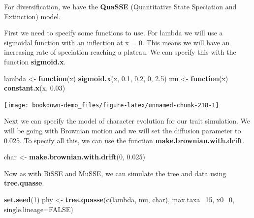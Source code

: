 \documentclass[
]{book}
\newenvironment{Shaded}{\begin{snugshade}}{\end{snugshade}}
\newcommand{\ControlFlowTok}[1]{\textcolor[rgb]{0.13,0.29,0.53}{\textbf{#1}}}
\newcommand{\DataTypeTok}[1]{\textcolor[rgb]{0.13,0.29,0.53}{#1}}
\newcommand{\DecValTok}[1]{\textcolor[rgb]{0.00,0.00,0.81}{#1}}
\newcommand{\FloatTok}[1]{\textcolor[rgb]{0.00,0.00,0.81}{#1}}
\newcommand{\KeywordTok}[1]{\textcolor[rgb]{0.13,0.29,0.53}{\textbf{#1}}}
\newcommand{\NormalTok}[1]{#1}
\newcommand{\OtherTok}[1]{\textcolor[rgb]{0.56,0.35,0.01}{#1}}
\newcommand{\StringTok}[1]{\textcolor[rgb]{0.31,0.60,0.02}{#1}}
\begin{document}
For diversification, we have the \textbf{QuaSSE} (Quantitative State Speciation and Extinction) model.

First we need to specify some functions to use. For lambda we will use a sigmoidal function with an inflection at x = 0. This means we will have an increasing rate of speciation reaching a plateau. We can specify this with the function \textbf{sigmoid.x}.

\begin{Shaded}
\begin{Highlighting}[]
\NormalTok{lambda \textless{}{-}}\StringTok{ }\ControlFlowTok{function}\NormalTok{(x) }\KeywordTok{sigmoid.x}\NormalTok{(x, }\FloatTok{0.1}\NormalTok{, }\FloatTok{0.2}\NormalTok{, }\DecValTok{0}\NormalTok{, }\FloatTok{2.5}\NormalTok{)}
\NormalTok{mu \textless{}{-}}\StringTok{ }\ControlFlowTok{function}\NormalTok{(x) }\KeywordTok{constant.x}\NormalTok{(x, }\FloatTok{0.03}\NormalTok{)}
\end{Highlighting}
\end{Shaded}

\begin{center}\texttt{[image: bookdown-demo\_files/figure-latex/unnamed-chunk-218-1]} \end{center}

Next we can specify the model of character evolution for our trait simulation. We will be going with Brownian motion and we will set the diffusion parameter to 0.025. To specify all this, we can use the function \textbf{make.brownian.with.drift}.

\begin{Shaded}
\begin{Highlighting}[]
\NormalTok{char \textless{}{-}}\StringTok{ }\KeywordTok{make.brownian.with.drift}\NormalTok{(}\DecValTok{0}\NormalTok{, }\FloatTok{0.025}\NormalTok{)}
\end{Highlighting}
\end{Shaded}

Now as with BiSSE and MuSSE, we can simulate the tree and data using \textbf{tree.quasse}.

\begin{Shaded}
\begin{Highlighting}[]
\KeywordTok{set.seed}\NormalTok{(}\DecValTok{1}\NormalTok{)}
\NormalTok{phy \textless{}{-}}\StringTok{ }\KeywordTok{tree.quasse}\NormalTok{(}\KeywordTok{c}\NormalTok{(lambda, mu, char), }\DataTypeTok{max.taxa=}\DecValTok{15}\NormalTok{, }\DataTypeTok{x0=}\DecValTok{0}\NormalTok{, }\DataTypeTok{single.lineage=}\OtherTok{FALSE}\NormalTok{)}
\end{Highlighting}
\end{Shaded}
\end{document}
